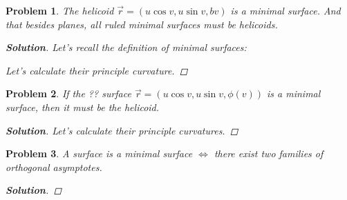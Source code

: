 \documentclass[11pt]{article}
\newtheorem{problem}{Problem}
\numberwithin{problem}{section}
\newenvironment{solution}
               {\let\oldqedsymbol=\qedsymbol
                \renewcommand{\qedsymbol}{$\blacktriangleleft$}
                \begin{proof}[\bfseries\upshape Solution]}
               {\end{proof}
                \renewcommand{\qedsymbol}{\oldqedsymbol}}
\begin{document}
\begin{problem}

The helicoid $\vec{r} = (u \cos v, u \sin v, bv) $ is a minimal surface. And that besides planes, all ruled minimal surfaces must be helicoids.

\begin{solution}

Let's recall the definition of minimal surfaces:

Let's calculate their principle curvature.

\end{solution}
\end{problem}
\begin{problem}

If the ?? surface $\vec{r} = (u \cos v, u \sin v, \phi(v))$ is a minimal surface, then it must be the helicoid.

\begin{solution}
Let's calculate their principle curvatures.

\end{solution}
\end{problem}
\begin{problem}

A surface is a minimal surface $\Leftrightarrow$ there exist two families of orthogonal asymptotes.

\begin{solution}


\end{solution}
\end{problem}
\end{document}
